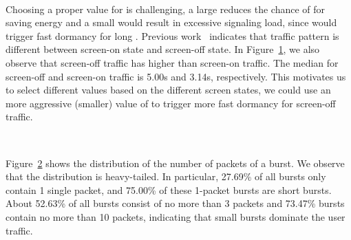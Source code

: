 \begin{figure}[t]
\centering
{} \\
\label{fig:cdf.screen}
\end{figure}
Choosing a proper value for \SBT is challenging, \ie a large \SBT reduces the chance of \NAME for saving energy and a small \SBT would result in excessive signaling load, since \NAME would trigger fast dormancy for long \IBTS. Previous work~\cite{imc.screen} indicates that traffic pattern is different between screen-on state and screen-off state. In Figure~\ref{fig:cdf.screen}, we also observe that screen-off traffic has higher \IBTS than screen-on traffic. The median \IBT for screen-off and screen-on traffic is 5.00s and 3.14s, respectively. This motivates us to select different \SBT values based on the different screen states, \ie we could use an more aggressive (smaller) value of \SBT to trigger more fast dormancy for screen-off traffic.

\begin{figure}[t]
\centering
{} \\
\label{fig:packetNum}
\end{figure}
Figure~\ref{fig:packetNum} shows the distribution of the number of packets of a burst. We observe that the distribution is heavy-tailed. In particular, 27.69\% of all bursts only contain 1 single packet, and 75.00\% of these 1-packet bursts are short bursts. About 52.63\% of all bursts consist of no more than 3 packets and 73.47\% bursts contain no more than 10 packets, indicating that small bursts dominate the user traffic.



